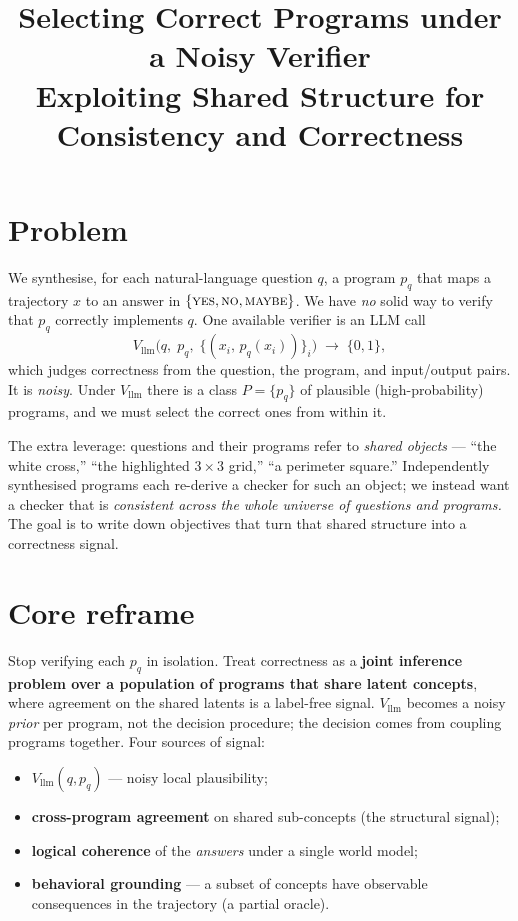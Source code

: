 \documentclass[11pt]{article}
\title{Selecting Correct Programs under a Noisy Verifier\\
\large Exploiting Shared Structure for Consistency and Correctness}
\author{}
\date{}
\newcommand{\YES}{\textsc{yes}}
\newcommand{\NO}{\textsc{no}}
\newcommand{\MAYBE}{\textsc{maybe}}
\newcommand{\Vllm}{V_{\mathrm{llm}}}
\begin{document}
\maketitle

\section*{Problem}

We synthesise, for each natural-language question $q$, a program $p_q$ that maps
a trajectory $x$ to an answer in $\{\YES,\NO,\MAYBE\}$. We have \emph{no} solid
way to verify that $p_q$ correctly implements $q$. One available verifier is an
LLM call
\[
\Vllm\big(q,\; p_q,\; \{(x_i,\, p_q(x_i))\}_i\big) \;\to\; \{0,1\},
\]
which judges correctness from the question, the program, and input/output
pairs. It is \emph{noisy}. Under $\Vllm$ there is a class
$P = \{p_q\}$ of plausible (high-probability) programs, and we must select the
correct ones from within it.

The extra leverage: questions and their programs refer to \emph{shared objects}
--- ``the white cross,'' ``the highlighted $3{\times}3$ grid,'' ``a perimeter
square.'' Independently synthesised programs each re-derive a checker for such an
object; we instead want a checker that is \emph{consistent across the whole
universe of questions and programs.} The goal is to write down objectives that
turn that shared structure into a correctness signal.

\section*{Core reframe}

Stop verifying each $p_q$ in isolation. Treat correctness as a \textbf{joint
inference problem over a population of programs that share latent concepts},
where agreement on the shared latents is a label-free signal. $\Vllm$ becomes a
noisy \emph{prior} per program, not the decision procedure; the decision comes
from coupling programs together. Four sources of signal:

\begin{itemize}[nosep]
  \item $\Vllm(q,p_q)$ --- noisy local plausibility;
  \item \textbf{cross-program agreement} on shared sub-concepts (the structural signal);
  \item \textbf{logical coherence} of the \emph{answers} under a single world model;
  \item \textbf{behavioral grounding} --- a subset of concepts have observable
        consequences in the trajectory (a partial oracle).
\end{itemize}
\end{document}
